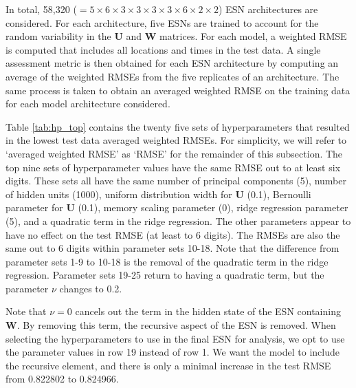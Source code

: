 \documentclass[AMS,STIX2COL]{WileyNJD-v2}
\begin{document}
In total, 58,320 ($=5\times6\times3\times3\times3\times3\times6\times2\times2$) ESN architectures are considered. For each architecture, five ESNs are trained to account for the random variability in the $\textbf{U}$ and $\textbf{W}$ matrices. For each model, a weighted RMSE is computed that includes all locations and times in the test data. A single assessment metric is then obtained for each ESN architecture by computing an average of the weighted RMSEs from the five replicates of an architecture. The same process is taken to obtain an averaged weighted RMSE on the training data for each model architecture considered.

Table \ref{tab:hp_top} contains the twenty five sets of hyperparameters that resulted in the lowest test data averaged weighted RMSEs. For simplicity, we will refer to `averaged weighted RMSE' as `RMSE' for the remainder of this subsection. The top nine sets of hyperparameter values have the same RMSE out to at least six digits. These sets all have the same number of principal components (5), number of hidden units (1000), uniform distribution width for $\textbf{U}$ (0.1), Bernoulli parameter for $\textbf{U}$ (0.1), memory scaling parameter (0), ridge regression parameter (5), and a quadratic term in the ridge regression. The other parameters appear to have no effect on the test RMSE (at least to 6 digits). The RMSEs are also the same out to 6 digits within parameter sets 10-18. Note that the difference from parameter sets 1-9 to 10-18 is the removal of the quadratic term in the ridge regression. Parameter sets 19-25 return to having a quadratic term, but the parameter $\nu$ changes to 0.2. 

Note that $\nu=0$ cancels out the term in the hidden state of the ESN containing $\textbf{W}$. By removing this term, the recursive aspect of the ESN is removed. When selecting the hyperparameters to use in the final ESN for analysis, we opt to use the parameter values in row 19 instead of row 1. We want the model to include the recursive element, and there is only a minimal increase in the test RMSE from 0.822802 to 0.824966.
\end{document}
